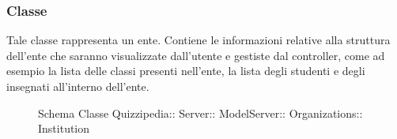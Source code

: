\subsubsection{Classe }
Tale classe rappresenta un ente. Contiene le informazioni relative alla struttura dell'ente che saranno visualizzate dall'utente e gestiste dal controller, come ad esempio la lista delle classi presenti nell'ente, la lista degli studenti e degli insegnati all'interno dell'ente.
\begin{figure}[H]
\centering
\noindent{}
\caption[Schema Classe Institution]{Schema Classe Quizzipedia:: Server:: ModelServer:: Organizations:: Institution}
\end{figure}
